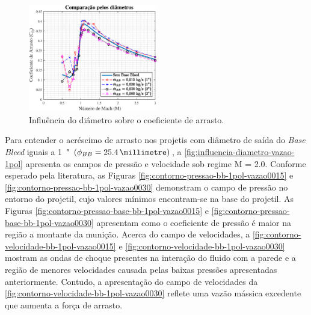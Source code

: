 \begin{figure}[!ht]
	\centering
    \includegraphics[width=0.5\textwidth]{cd-combasebleed-diametro-1e2pol.eps}
	\caption{Influência do diâmetro sobre o coeficiente de arrasto.}
	\label{fig:comparacao-bb-diametro-1e2pol}
\end{figure}

Para entender o acréscimo de arrasto nos projetis com diâmetro de saída do \textit{Base Bleed} iguais a \qty{1}{"} \(\left(\phi_{BB} = \qty{25,4}{\millimetre}\right)\), a \autoref{fig:influencia-diametro-vazao-1pol} apresenta os campos de pressão e velocidade sob regime M = \num{2,0}. Conforme esperado pela literatura, as Figuras \ref{fig:contorno-pressao-bb-1pol-vazao0015} e \ref{fig:contorno-pressao-bb-1pol-vazao0030} demonstram o campo de pressão no entorno do projetil, cujo valores mínimos encontram-se na base do projetil. As Figuras \ref{fig:contorno-pressao-base-bb-1pol-vazao0015} e \ref{fig:contorno-pressao-base-bb-1pol-vazao0030} apresentam como o coeficiente de pressão é maior na região a montante da munição. Acerca do campo de velocidades, a \autoref{fig:contorno-velocidade-bb-1pol-vazao0015} e \autoref{fig:contorno-velocidade-bb-1pol-vazao0030} mostram as ondas de choque presentes na interação do fluido com a parede e a região de menores velocidades causada pelas baixas pressões apresentadas anteriormente. Contudo, a apresentação do campo de velocidades da \autoref{fig:contorno-velocidade-bb-1pol-vazao0030} reflete uma vazão mássica excedente que aumenta a força de arrasto.

